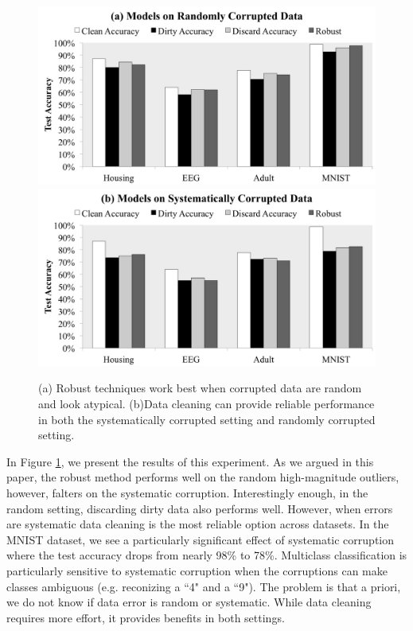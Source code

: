 \begin{figure}[ht!]
\centering
 \includegraphics[width=\columnwidth]{exp/exp2.pdf}
 \includegraphics[width=\columnwidth]{exp/exp1.pdf}
 \caption{(a) Robust techniques work best when corrupted data are random and look atypical. (b)Data cleaning can provide reliable performance in both the systematically corrupted setting and randomly corrupted setting.\label{sys-rand}}
\end{figure}

In Figure \ref{sys-rand}, we present the results of this experiment.
As we argued in this paper, the robust method performs well on the random high-magnitude outliers, however, falters on the systematic corruption.
Interestingly enough, in the random setting, discarding dirty data also performs well.
However, when errors are systematic data cleaning is the most reliable option across datasets.
In the MNIST dataset, we see a particularly significant effect of systematic corruption
where the test accuracy drops from nearly 98\% to 78\%.
Multiclass classification is particularly sensitive to systematic corruption when the corruptions can make classes ambiguous (e.g. reconizing a ``4" and a ``9").
The problem is that a priori, we do not know if data error is random or systematic.
While data cleaning requires more effort, it provides benefits in both settings.


